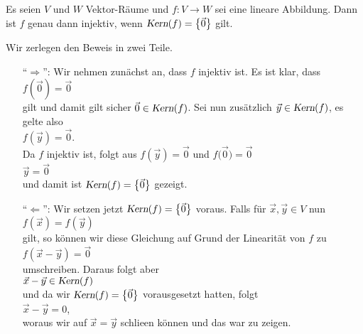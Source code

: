 \begin{Satz}
  Es seien $V$ und $W$ Vektor-R\"{a}ume und $f:V \rightarrow W$ sei eine lineare Abbildung.
  Dann ist $f$ genau dann injektiv, wenn $\textsl{Kern}(f) = \bigl\{ \vec{0} \bigr\}$ gilt.
\end{Satz}

\proof
Wir zerlegen den Beweis in zwei Teile.
\begin{enumerate}
\item[``$\Rightarrow$'':] Wir nehmen zun\"{a}chst an, dass $f$ injektiv ist.  Es ist klar, dass
      \\[0.2cm]
      \hspace*{1.3cm}
      $f(\vec{0}) = \vec{0}$
      \\[0.2cm]
      gilt und damit gilt sicher $\vec{0} \in \textsl{Kern}(f)$.  Sei nun zus\"{a}tzlich $\vec{y} \in \textsl{Kern}(f)$, es
      gelte also 
      \\[0.2cm]
      \hspace*{1.3cm}
      $f(\vec{y}) = \vec{0}$.
      \\[0.2cm]
      Da $f$ injektiv ist, folgt aus $f(\vec{y}) = \vec{0}$ und $f\bigl(\vec{0}\bigr) = \vec{0}$
      \\[0.2cm]
      \hspace*{1.3cm}
      $\vec{y} = \vec{0}$
      \\[0.2cm]
      und damit ist $\textsl{Kern}(f) = \bigl\{ \vec{0} \bigr\}$ gezeigt.
\item[``$\Leftarrow$'':] Wir setzen jetzt $\textsl{Kern}(f) = \bigl\{ \vec{0} \bigr\}$ voraus.  Falls f\"{u}r $\vec{x}, \vec{y} \in V$
      nun
      \\[0.2cm]
      \hspace*{1.3cm}
      $f(\vec{x}) = f(\vec{y})$
      \\[0.2cm]
      gilt, so k\"{o}nnen wir diese Gleichung auf Grund der Linearit\"{a}t von $f$ zu
      \\[0.2cm]
      \hspace*{1.3cm}
      $f(\vec{x} - \vec{y}) = \vec{0}$
      \\[0.2cm]
      umschreiben.  Daraus folgt aber
      \\[0.2cm]
      \hspace*{1.3cm}
      $\vec{x} - \vec{y} \in \textsl{Kern}(f)$
      \\[0.2cm]
      und da wir $\textsl{Kern}(f) = \bigl\{ \vec{0} \bigr\}$ vorausgesetzt hatten, folgt
      \\[0.2cm]
      \hspace*{1.3cm}
      $\vec{x} - \vec{y} = 0$,
      \\[0.2cm]
      woraus wir auf $\vec{x} = \vec{y}$ schlie\3en k\"{o}nnen und das war zu zeigen.  \qeds
\end{enumerate}

